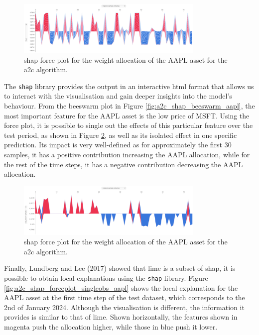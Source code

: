 \begin{figure}
    \centering
    \includegraphics[width=0.8\textwidth]{figures/a2c_shap_forceplot_aapl.png}
    \caption{\acrshort{shap} force plot for the weight allocation of the AAPL asset for the \acrshort{a2c} algorithm.}
    \label{fig:a2c_shap_forceplot_aapl}
\end{figure}

The \texttt{shap} library provides the output in an interactive \acrfull{html} format that allows us to interact with the visualisation and gain deeper insights into the model's behaviour. From the beeswarm plot in Figure \ref{fig:a2c_shap_beeswarm_aapl}, the most important feature for the AAPL asset is the low price of MSFT. Using the force plot, it is possible to single out the effects of this particular feature over the test period, as shown in Figure \ref{fig:a2c_shap_forceplot_aapl_lowmsft}, as well as its isolated effect in one specific prediction. Its impact is very well-defined as for approximately the first 30 samples, it has a positive contribution increasing the AAPL allocation, while for the rest of the time steps, it has a negative contribution decreasing the AAPL allocation.

\begin{figure}
    \centering
    \includegraphics[width=0.8\textwidth]{figures/a2c_shap_forceplot_aapl_lowmsft.png}
    \caption{\acrshort{shap} force plot for the weight allocation of the AAPL asset for the \acrshort{a2c} algorithm.}
    \label{fig:a2c_shap_forceplot_aapl_lowmsft}
\end{figure}

Finally, Lundberg and Lee (2017) \cite{Lundberg2017} showed that \acrshort{lime} is a subset of \acrshort{shap}, it is possible to obtain local explanations using the \texttt{shap} library. Figure \ref{fig:a2c_shap_forceplot_singleobs_aapl} shows the local explanation for the AAPL asset at the first time step of the test dataset, which corresponds to the 2nd of January 2024. Although the visualisation is different, the information it provides is similar to that of \acrshort{lime}. Shown horizontally, the features shown in magenta push the allocation higher, while those in blue push it lower. 


